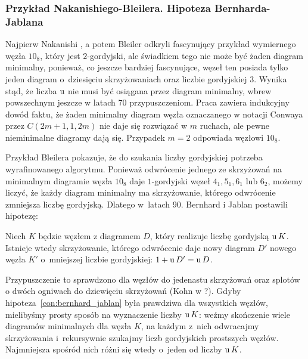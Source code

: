 
\subsubsection{Przykład Nakanishiego-Bleilera. Hipoteza Bernharda-Jablana}
Najpierw Nakanishi \cite{nakanishi1983}, a potem Bleiler \cite{bleiler1984} odkryli fascynujący przykład wymiernego węzła $10_8$, który jest $2$-gordyjski, ale świadkiem tego nie może być żaden diagram minimalny, ponieważ, co jeszcze bardziej fascynujące, węzeł ten posiada tylko jeden diagram o~dziesięciu skrzyżowaniach oraz liczbie gordyjskiej 3.
%
%
%
Wynika stąd, że liczba $\operatorname{u}$ nie musi być osiągana przez diagram minimalny, wbrew powszechnym jeszcze w latach 70 przypuszczeniom.
Praca \cite{bernhard1994} zawiera indukcyjny dowód faktu, że żaden minimalny diagram węzła oznaczanego w notacji Conwaya przez $C(2m+1, 1, 2m)$ nie daje się rozwiązać w $m$ ruchach, ale pewne nieminimalne diagramy dają się.
Przypadek $m = 2$ odpowiada węzłowi $10_8$.

Przykład Bleilera pokazuje, że do szukania liczby gordyjskiej potrzeba wyrafinowanego algorytmu.
Ponieważ odwrócenie jednego ze skrzyżowań na minimalnym diagramie węzła $10_8$ daje $1$-gordyjski węzeł $4_1, 5_1, 6_1$ lub $6_2$, możemy liczyć, że każdy diagram minimalny ma skrzyżowanie, którego odwrócenie zmniejsza liczbę gordyjską.
Dlatego w~latach 90. Bernhard \cite{bernhard1994} i Jablan \cite{jablan1998} postawili hipotezę:

\begin{conjecture}
%
%
%
\label{con:bernhard_jablan}%
    Niech $K$ będzie węzłem z diagramem $D$, który realizuje liczbę gordyjską $\operatorname{u} K$.
    Istnieje wtedy skrzyżowanie, którego odwrócenie daje nowy diagram $D'$ nowego węzła $K'$ o~mniejszej liczbie gordyjskiej: $1 + \operatorname{u} D' = \operatorname{u} D$.
\end{conjecture}

Przypuszczenie to sprawdzono dla węzłów do jedenastu skrzyżowań oraz splotów o dwóch ogniwach do dziewięciu skrzyżowań (Kohn w \cite{kohn1993}?).
%
Gdyby hipoteza~\ref{con:bernhard_jablan} była prawdziwa dla wszystkich węzłów, mielibyśmy prosty sposób na wyznaczenie liczby $\operatorname{u} K$: weźmy skończenie wiele diagramów minimalnych dla węzła $K$, na każdym z~nich odwracajmy skrzyżowania i~rekursywnie szukajmy liczb gordyjskich prostszych węzłów.
Najmniejsza spośród nich różni się wtedy o~jeden od liczby $\operatorname{u} K$.

